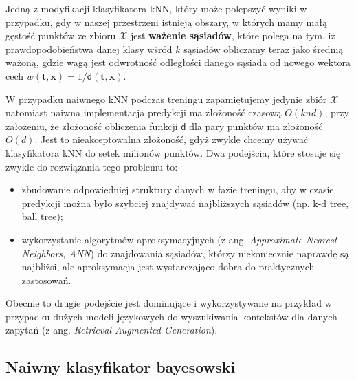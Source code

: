 \documentclass{myclass}
\numberwithin{equation}{subsection}
\begin{document}
Jedną z modyfikacji klasyfikatora kNN, który może polepszyć wyniki w przypadku, gdy w naszej
przestrzeni istnieją obszary, w których mamy małą gęstość punktów ze zbioru \(\mathcal{X}\) jest
\textbf{ważenie sąsiadów}, które polega na tym, iż prawdopodobieństwa danej klasy wśród \(k\)
sąsiadów obliczamy teraz jako średnią ważoną, gdzie wagą jest odwrotność odległości danego sąsiada
od nowego wektora cech \(w(\mathbf{t}, \mathbf{x}) = 1 / \mathsf{d}(\mathbf{t}, \mathbf{x})\).

W przypadku naiwnego kNN podczas treningu zapamiętujemy jedynie zbiór \(\mathcal{X}\) natomiast
naiwna implementacja predykcji ma złożoność czasową \(O(knd)\), przy założeniu, że złożoność
obliczenia funkcji \(\mathsf{d}\) dla pary punktów ma złożoność \(O(d)\). Jest to nieakceptowalna
złożoność, gdyż zwykle chcemy używać klasyfikatora kNN do setek milionów punktów. Dwa podejścia,
które stosuje się zwykle do rozwiązania tego problemu to: 
\begin{itemize}

    \item zbudowanie odpowiedniej struktury danych w fazie treningu, aby w czasie predykcji można
    było szybciej znajdywać najbliższych sąsiadów (np. k-d tree, ball tree);

    \item wykorzystanie algorytmów aproksymacyjnych (z ang. \textit{Approximate Nearest Neighbors,
    ANN}) do znajdowania sąsiadów, którzy niekoniecznie naprawdę są najbliżsi, ale aproksymacja jest
    wystarczająco dobra do praktycznych zastosowań.

\end{itemize}

Obecnie to drugie podejście jest dominujące i wykorzystywane na przykład w przypadku dużych modeli
językowych do wyszukiwania kontekstów dla danych zapytań (z ang. \textit{Retrieval Augmented
Generation}).


\subsection{Naiwny klasyfikator bayesowski}
\end{document}
